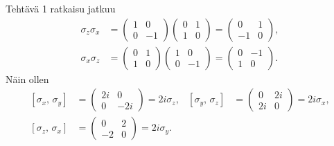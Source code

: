 \documentclass[12pt, a4paper, t]{beamer}
\theoremstyle{exercise}
\theoremstyle{remark}
\theoremstyle{definition}
\newcommand{\comm}[2]{\ensuremath{\left[ #1,\, #2 \right]}}
\begin{document}
\begin{frame}{Tehtävä 1 ratkaisu jatkuu}
\vspace{12pt}
\begin{align*}
\sigma_z\sigma_x & = \begin{pmatrix}1& 0\\0&-1\end{pmatrix}\begin{pmatrix}0&1\\1&0\end{pmatrix}
=\begin{pmatrix}0&1\\-1&0\end{pmatrix},
 \\
 \sigma_x\sigma_z &=\begin{pmatrix}0&1\\1&0\end{pmatrix}\begin{pmatrix}1& 0\\0&-1\end{pmatrix}
 =\begin{pmatrix}0&-1\\1&0\end{pmatrix}.
\end{align*}
Näin ollen 
\begin{align*}
\comm{\sigma_x}{\sigma_y}&=\begin{pmatrix}
2i & 0\\
0 & -2i
\end{pmatrix}=2i\sigma_z, & \comm{\sigma_y}{\sigma_z}&=\begin{pmatrix}
0 & 2i\\
2i & 0
\end{pmatrix}=2i\sigma_x,\\
\comm{\sigma_z}{\sigma_x}&=\begin{pmatrix}
0 & 2\\
-2 & 0
\end{pmatrix}=2i\sigma_y.
\end{align*}
\end{frame}
\end{document}
